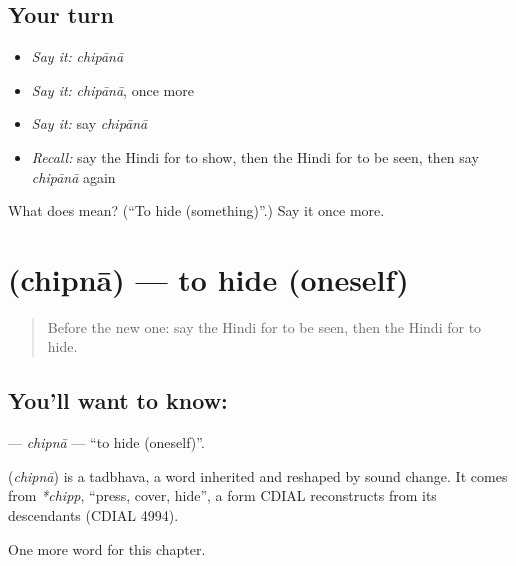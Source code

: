 \subsection*{Your turn}
\begin{itemize}
\raggedright
  \item \emph{Say it:} \emph{chipānā}
  \item \emph{Say it:} \emph{chipānā}, once more
  \item \emph{Say it:} say \emph{chipānā}
  \item \emph{Recall:} say the Hindi for to show, then the Hindi for to be seen, then say \emph{chipānā} again
\end{itemize}

\begin{tcolorbox}[breakable,colback=teal!4,colframe=teal!35!black,title={Before you move on}]
What does  mean? (\textquotedblleft{}To hide (something)\textquotedblright{}.) Say it once more.
\end{tcolorbox}
\section[\texorpdfstring{\hi{छिपना} (chipnā)}{छिपना (chipnā)}]{ (chipnā) — to hide (oneself)}

\label{lesson:HI-C171-chipna}



\begin{quote}
Before the new one: say the Hindi for to be seen, then the Hindi for to hide.
\end{quote}

\subsection*{You'll want to know: }
\textbf{} — \emph{chipnā} — \textquotedblleft{}to hide (oneself)\textquotedblright{}.

\begin{cousinweb}
\textbf{} (\emph{chipnā}) is a tadbhava, a word inherited and reshaped by sound change. It comes from \emph{*chipp}, \textquotedblleft{}press, cover, hide\textquotedblright{}, a form CDIAL reconstructs from its descendants (CDIAL 4994).
\end{cousinweb}

\begin{grammarlens}[title={What you've built}]
One more word for this chapter.
\end{grammarlens}


